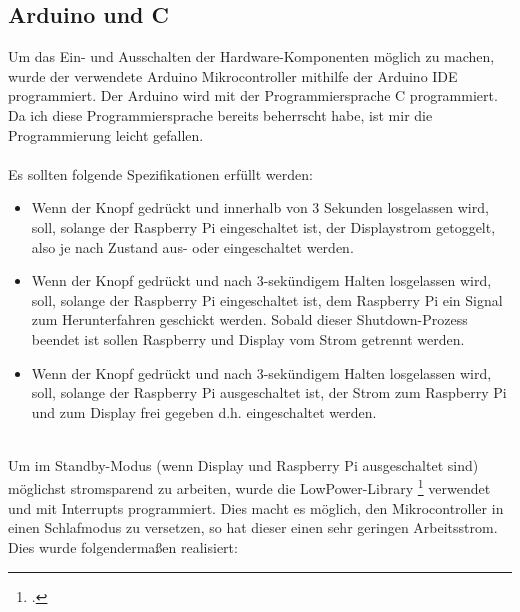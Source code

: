 \subsection{Arduino und C}

Um das Ein- und Ausschalten der Hardware-Komponenten möglich zu machen, wurde der verwendete Arduino Mikrocontroller mithilfe der Arduino IDE programmiert. Der Arduino wird mit der Programmiersprache C programmiert. Da ich diese Programmiersprache bereits beherrscht habe, ist mir die Programmierung leicht gefallen.\\
\\
Es sollten folgende Spezifikationen erfüllt werden:
\begin{itemize}
	\item Wenn der Knopf gedrückt und innerhalb von 3 Sekunden losgelassen wird, soll, solange der Raspberry Pi eingeschaltet ist, der Displaystrom getoggelt, also je nach Zustand aus- oder eingeschaltet werden.
	\item Wenn der Knopf gedrückt und nach 3-sekündigem Halten losgelassen wird, soll, solange der Raspberry Pi eingeschaltet ist, dem Raspberry Pi ein Signal zum Herunterfahren geschickt werden. Sobald dieser Shutdown-Prozess beendet ist sollen Raspberry und Display vom Strom getrennt werden.
	\item Wenn der Knopf gedrückt und nach 3-sekündigem Halten losgelassen wird, soll, solange der Raspberry Pi ausgeschaltet ist, der Strom zum Raspberry Pi und zum Display frei gegeben d.h. eingeschaltet werden.
\end{itemize}
\ \\
Um im Standby-Modus (wenn Display und Raspberry Pi ausgeschaltet sind) möglichst stromsparend zu arbeiten, wurde die LowPower-Library \footcite{lowpower_lib} verwendet und mit Interrupts programmiert. Dies macht es möglich, den Mikrocontroller in einen Schlafmodus zu versetzen, so hat dieser einen sehr geringen Arbeitsstrom.
\\
Dies wurde folgendermaßen realisiert:
